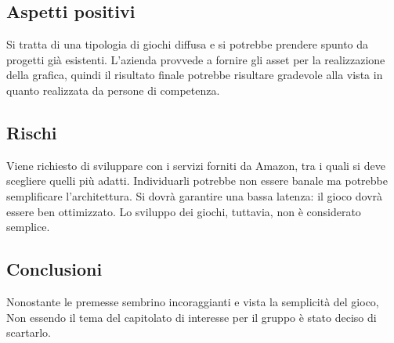 \documentclass[../studio-di-fattibilita.tex]{subfiles}
\begin{document}
\subsection{Aspetti positivi}%
\label{sub:aspetti_positivi}
Si tratta di una tipologia di giochi diffusa e si potrebbe prendere spunto da progetti già esistenti. 
L’azienda provvede a fornire gli asset per la realizzazione della grafica, quindi il risultato finale potrebbe risultare gradevole alla vista in quanto realizzata da persone di competenza. 

\subsection{Rischi}%
\label{sub:c6_rischi}
Viene richiesto di sviluppare con i servizi forniti da Amazon, tra i quali si deve scegliere quelli più adatti. Individuarli potrebbe non essere banale ma potrebbe semplificare l’architettura. 
Si dovrà garantire una bassa latenza: il gioco dovrà essere ben ottimizzato. Lo sviluppo dei giochi, tuttavia, non è considerato semplice.

\subsection{Conclusioni}%
\label{sub:c6_conclusioni}
Nonostante le premesse sembrino incoraggianti e vista la semplicità del gioco, Non essendo il tema del capitolato di interesse per il gruppo è stato deciso di scartarlo.
\end{document}
